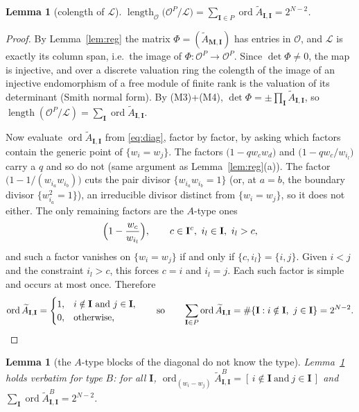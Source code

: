 \documentclass[11pt]{article}
\theoremstyle{plain}
\newtheorem{lem}[thm]{Lemma}
\theoremstyle{definition}
\theoremstyle{remark}
\theoremstyle{plain}
\newcommand{\bI}{\mathbf{I}}
\newcommand{\bM}{\mathbf{M}}
\newcommand{\At}{\widetilde{A}}
\newcommand{\ord}{\operatorname{ord}}
\newcommand{\Lat}{\mathcal{L}}
\begin{document}
\begin{lem}[colength of $\Lat$]\label{lem:colenL}
$\operatorname{length}_{\mathcal{O}}\bigl(\mathcal{O}^{P}/\Lat\bigr)
=\sum_{\bI\in P}\ord\At_{\bI,\bI}=2^{N-2}$.
\end{lem}

\begin{proof}
By Lemma~\ref{lem:reg} the matrix $\Phi=(\At_{\bM,\bI})$ has entries in
$\mathcal{O}$, and $\Lat$ is exactly its column span, i.e.\ the image of
$\Phi:\mathcal{O}^{P}\to\mathcal{O}^{P}$.  Since $\det\Phi\ne0$, the map is
injective, and over a discrete valuation ring the colength of the image of an
injective endomorphism of a free module of finite rank is the valuation of its
determinant (Smith normal form).  By (M3)+(M4),
$\det\Phi=\pm\prod_\bI\At_{\bI,\bI}$, so
$\operatorname{length}(\mathcal{O}^{P}/\Lat)=\sum_\bI\ord\At_{\bI,\bI}$.

Now evaluate $\ord\At_{\bI,\bI}$ from \eqref{eq:diag}, factor by factor, by
asking which factors contain the generic point of $\{w_i=w_j\}$.  The factors
$\bigl(1-qw_cw_d\bigr)$ and $\bigl(1-qw_c/w_{i_l}\bigr)$ carry a $q$ and so do
not (same argument as Lemma~\ref{lem:reg}(a)).  The factor
$\bigl(1-1/(w_{i_a}w_{i_b})\bigr)$ cuts the pair divisor $\{w_{i_a}w_{i_b}=1\}$
(or, at $a=b$, the boundary divisor $\{w_{i_a}^2=1\}$), an irreducible divisor
distinct from $\{w_i=w_j\}$, so it does not either.  The only remaining factors
are the $A$-type ones
\[
  \Bigl(1-\frac{w_c}{w_{i_l}}\Bigr),\qquad c\in\bI^{c},\ i_l\in\bI,\ i_l>c,
\]
and such a factor vanishes on $\{w_i=w_j\}$ if and only if $\{c,i_l\}=\{i,j\}$.
Given $i<j$ and the constraint $i_l>c$, this forces $c=i$ and $i_l=j$.  Each such
factor is simple and occurs at most once.  Therefore
\[
  \ord\At_{\bI,\bI}=
  \begin{cases}1,& i\notin\bI\ \text{and}\ j\in\bI,\\ 0,&\text{otherwise,}\end{cases}
  \qquad\text{so}\qquad
  \sum_{\bI\in P}\ord\At_{\bI,\bI}=\#\{\bI: i\notin\bI,\ j\in\bI\}=2^{N-2}. \qedhere
\]
\end{proof}

\begin{lem}[the $A$-type blocks of the diagonal do not know the type]\label{lem:typeB}
Lemma~\ref{lem:colenL} holds verbatim for type $B$: for all $\bI$,
$\ord_{(w_i-w_j)}\At^{B}_{\bI,\bI}=[\,i\notin\bI\ \text{and}\ j\in\bI\,]$ and
$\sum_\bI\ord\At^{B}_{\bI,\bI}=2^{N-2}$.
\end{lem}
\end{document}
